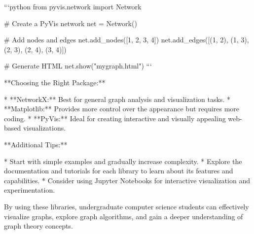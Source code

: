 ```python
from pyvis.network import Network

# Create a PyVis network
net = Network()

# Add nodes and edges
net.add_nodes([1, 2, 3, 4])
net.add_edges([(1, 2), (1, 3), (2, 3), (2, 4), (3, 4)])

# Generate HTML
net.show("mygraph.html") 
```

**Choosing the Right Package:**

*   **NetworkX:** Best for general graph analysis and visualization tasks.
*   **Matplotlib:** Provides more control over the appearance but requires more coding.
*   **PyVis:** Ideal for creating interactive and visually appealing web-based visualizations.

**Additional Tips:**

*   Start with simple examples and gradually increase complexity.
*   Explore the documentation and tutorials for each library to learn about its features and capabilities.
*   Consider using Jupyter Notebooks for interactive visualization and experimentation.

By using these libraries, undergraduate computer science students can effectively visualize graphs, explore graph algorithms, and gain a deeper understanding of graph theory concepts.
